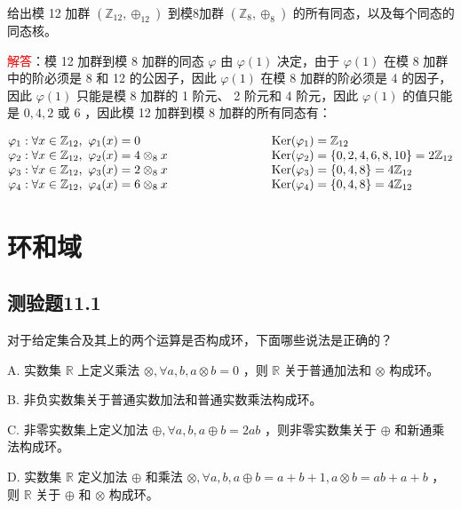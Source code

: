 \documentclass[UTF8, heading=true]{ctexart}
\begin{document}
给出模 12 加群 $\left(\mathbb{Z}_{12}, \oplus_{12}\right)$ 到模8加群 $\left(\mathbb{Z}_8, \oplus_8\right)$ 的所有同态，以及每个同态的同态核。

\textcolor{red}{解答}：模 12 加群到模 8 加群的同态 $\varphi$ 由 $\varphi(1)$ 决定，由于 $\varphi(1)$ 在模 8 加群中的阶必须是 8 和 12 的公因子，因此 $\varphi(1)$ 在模 8 加群的阶必须是 4 的因子，因此 $\varphi(1)$ 只能是模 8 加群的 1 阶元、 2 阶元和 4 阶元，因此 $\varphi(1)$ 的值只能是 $0, 4, 2$ 或 $6$ ，因此模 12 加群到模 8 加群的所有同态有：

\[
\begin{tabular}{@{}l@{\hspace{3cm}}l@{}}
$\varphi_1: \forall x \in \mathbb{Z}_{12},\ \varphi_1(x) = 0$ &
$\operatorname{Ker}(\varphi_1) = \mathbb{Z}_{12}$ \\
$\varphi_2: \forall x \in \mathbb{Z}_{12},\ \varphi_2(x) = 4 \otimes_8 x$ &
$\operatorname{Ker}(\varphi_2) = \{0,2,4,6,8,10\} = 2\mathbb{Z}_{12}$ \\
$\varphi_3: \forall x \in \mathbb{Z}_{12},\ \varphi_3(x) = 2 \otimes_8 x$ &
$\operatorname{Ker}(\varphi_3) = \{0,4,8\} = 4\mathbb{Z}_{12}$ \\
$\varphi_4: \forall x \in \mathbb{Z}_{12},\ \varphi_4(x) = 6 \otimes_8 x$ &
$\operatorname{Ker}(\varphi_4) = \{0,4,8\} = 4\mathbb{Z}_{12}$
\end{tabular}
\]

\clearpage

\section{环和域}

\subsection{测验题11.1}

对于给定集合及其上的两个运算是否构成环，下面哪些说法是正确的？

A. 实数集 $\mathbb{R}$ 上定义乘法 $\otimes, \forall a, b, a \otimes b=0$ ，则 $\mathbb{R}$ 关于普通加法和 $\otimes$ 构成环。

B. 非负实数集关于普通实数加法和普通实数乘法构成环。

C. 非零实数集上定义加法 $\oplus, \forall a, b, a \oplus b=2 a b$ ，则非零实数集关于 $\oplus$ 和新通乘法构成环。

D. 实数集 $\mathbb{R}$ 定义加法 $\oplus$ 和乘法 $\otimes, \forall a, b, a \oplus b=a+b+1, a \otimes b=a b+a+b$ ，则 $\mathbb{R}$ 关于 $\oplus$ 和 $\otimes$ 构成环。
\end{document}
